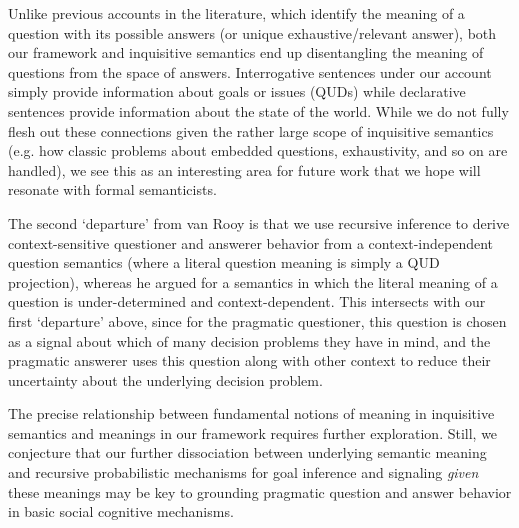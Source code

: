 \documentclass[11pt, floatsintext]{apa6}
\begin{document}
Unlike previous accounts in the literature, which identify the meaning of a question with its possible answers (or unique exhaustive/relevant answer), both our framework and inquisitive semantics end up disentangling the meaning of questions from the space of answers. Interrogative sentences under our account simply provide information about goals or issues (QUDs) while declarative sentences provide information about the state of the world. While we do not fully flesh out these connections given the rather large scope of inquisitive semantics (e.g. how classic problems about embedded questions, exhaustivity, and so on are handled), we see this as an interesting area for future work that we hope will resonate with formal semanticists.

The second ‘departure’ from van Rooy is that we use recursive inference to derive context-sensitive questioner and answerer behavior from a context-independent question semantics (where a literal question meaning is simply a QUD projection), whereas he argued for a semantics in which the literal meaning of a question is under-determined and context-dependent. This intersects with our first ‘departure’ above, since for the pragmatic questioner, this question is chosen as a signal about which of many decision problems they have in mind, and the pragmatic answerer uses this question along with other context to reduce their uncertainty about the underlying decision problem.

The precise relationship between fundamental notions of meaning in inquisitive semantics and meanings in our framework requires further exploration. 
Still, we conjecture that our further dissociation between underlying semantic meaning and recursive probabilistic mechanisms for goal inference and signaling \emph{given} these meanings may be key to grounding pragmatic question and answer behavior in basic social cognitive mechanisms.

\end{document}
